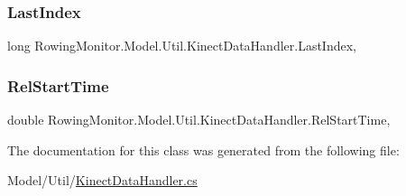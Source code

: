 \subsubsection{\texorpdfstring{Last\+Index}{LastIndex}}
{\footnotesize\ttfamily long Rowing\+Monitor.\+Model.\+Util.\+Kinect\+Data\+Handler.\+Last\+Index\hspace{0.3cm}{\ttfamily [get]}, {\ttfamily [set]}}

\mbox{\label{class_rowing_monitor_1_1_model_1_1_util_1_1_kinect_data_handler_aa21aa573d216387e67181b49bf4eb4f5}} 
\subsubsection{\texorpdfstring{Rel\+Start\+Time}{RelStartTime}}
{\footnotesize\ttfamily double Rowing\+Monitor.\+Model.\+Util.\+Kinect\+Data\+Handler.\+Rel\+Start\+Time\hspace{0.3cm}{\ttfamily [get]}, {\ttfamily [set]}}



The documentation for this class was generated from the following file\+:\begin{DoxyCompactItemize}
\item 
Model/\+Util/\hyperlink{_kinect_data_handler_8cs}{Kinect\+Data\+Handler.\+cs}\end{DoxyCompactItemize}

